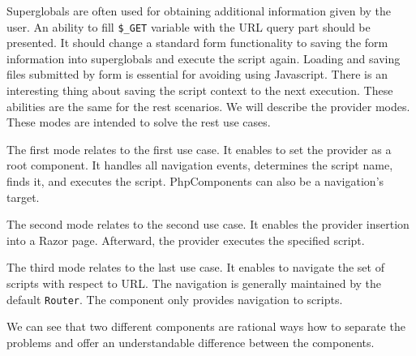Superglobals are often used for obtaining additional information given by the user.
An ability to fill \texttt{\$\_GET} variable with the URL query part should be presented.
It should change a standard form functionality to saving the form information into superglobals and execute the script again.
Loading and saving files submitted by form is essential for avoiding using Javascript.
There is an interesting thing about saving the script context to the next execution.
These abilities are the same for the rest scenarios.
We will describe the provider modes.
These modes are intended to solve the rest use cases. 
\par
The first mode relates to the first use case.
It enables to set the provider as a root component.
It handles all navigation events, determines the script name, finds it, and executes the script.
PhpComponents can also be a navigation's target.
\par
The second mode relates to the second use case.
It enables the provider insertion into a Razor page.
Afterward, the provider executes the specified script.
\par
The third mode relates to the last use case.
It enables to navigate the set of scripts with respect to URL.
The navigation is generally maintained by the default \texttt{Router}.
The component only provides navigation to scripts.
\par
We can see that two different components are rational ways how to separate the problems and offer an understandable difference between the components.


